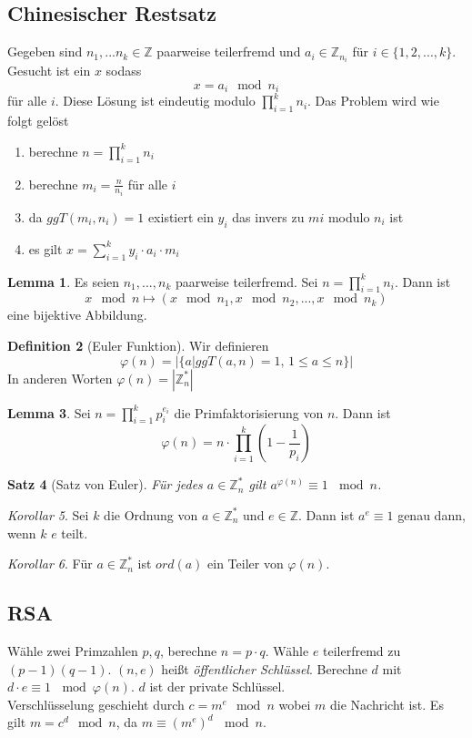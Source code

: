 \documentclass[a4paper, 12pt]{article}
\theoremstyle{plain}
\newtheorem{theorem}{Satz}[subsection] %
\theoremstyle{definition}
\newtheorem{definition}[theorem]{Definition} %
\theoremstyle{lemma}
\newtheorem{lemma}[theorem]{Lemma}
\theoremstyle{remark}
\theoremstyle{corollary}
\newtheorem{corollary}[theorem]{Korollar}
\theoremstyle{example}
\begin{document}
		\subsection{Chinesischer Restsatz}
	Gegeben sind $n_1,...n_k \in \mathbb{Z}$ paarweise teilerfremd und $a_i \in \mathbb{Z}_{n_i}$ für $i \in \{1,2,...,k\}$. Gesucht ist ein $x$ sodass \[x = a_i \mod n_i\] für alle $i$. Diese Lösung ist eindeutig modulo $\prod_{i=1}^{k} n_i$. Das Problem wird wie folgt gelöst \begin{enumerate}
		\item berechne $n = \prod_{i=1}^k n_i$
		\item berechne $m_i = \frac{n}{n_i}$ für alle $i$
		\item da $ggT(m_i,n_i) = 1$ existiert ein $y_i$ das invers zu $mi$ modulo $n_i$ ist
		\item es gilt $x = \sum_{i=1}^k y_i\cdot a_i \cdot m_i$
	\end{enumerate}
	\begin{lemma}
		Es seien $n_1,...,n_k$ paarweise teilerfremd. Sei $n = \prod_{i=1}^k n_i$. Dann ist \[x \mod n \mapsto (x \mod n_1, x \mod n_2, ..., x\mod n_k)\] eine bijektive Abbildung.
	\end{lemma}
	\begin{definition}[Euler Funktion]
		Wir definieren \[\varphi(n) = \left|\{a | ggT(a,n) = 1, \, 1 \leq a \leq n\}\right|\] In anderen Worten $\varphi(n) = \left|\mathbb{Z}_n^*\right|$
	\end{definition}
	\begin{lemma}
		Sei $n = \prod_{i=1}^k p_i^{e_i}$ die Primfaktorisierung von $n$. Dann ist \[\varphi(n) = n \cdot \prod_{i=1}^k \left(1-\frac{1}{p_i}\right)\]
	\end{lemma}
	\begin{theorem}[Satz von Euler]
		Für jedes $a\in\mathbb{Z}_n^*$ gilt $a^{\varphi(n)}\equiv 1 \, \mod n$.
	\end{theorem}
	\begin{corollary}
		Sei $k$ die Ordnung von $a\in\mathbb{Z}_n^*$ und $e\in\mathbb{Z}$. Dann ist $a^e\equiv 1$ genau dann, wenn $k$ $e$ teilt.
	\end{corollary}
	\begin{corollary}
		Für $a\in\mathbb{Z}_n^*$ ist $ord(a)$ ein Teiler von $\varphi(n)$.
	\end{corollary}
	\subsection{RSA}
	Wähle zwei Primzahlen $p,q$, berechne $n=p\cdot q$. Wähle $e$ teilerfremd zu $(p-1)(q-1)$. $(n,e)$ heißt \textit{öffentlicher Schlüssel}. Berechne $d$ mit $d\cdot e \equiv 1 \, \mod \varphi(n)$. $d$ ist der private Schlüssel.\\
	Verschlüsselung geschieht durch $c = m^e \mod n$ wobei $m$ die Nachricht ist. Es gilt $m = c^d \mod n$, da $m\equiv (m^e)^d \, \mod n$.
\end{document}
